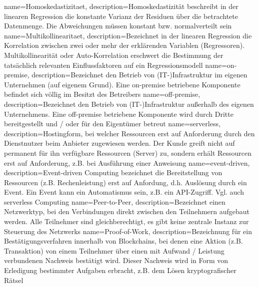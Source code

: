 {
    name=Homoskedastizitaet,
    description={Homoskedastizität beschreibt in der linearen Regression die konstante Varianz der Residuen über die betrachtete Datenmenge. Die Abweichungen müssen konstant bzw. normalverteilt sein}
}
{
    name=Multikollinearitaet,
    description={Bezeichnet in der linearen Regression die Korrelation zwischen zwei oder mehr der erklärenden Variablen (Regressoren). Multikollinearität oder Auto-Korrelation erschwert die Bestimmung der tatsächlich relevanten Einflussfaktoren auf ein Regressionsmodell}
}
{
    name=on-premise,
    description={Bezeichnet den Betrieb von (IT-)Infrastruktur im eigenen Unternehmen (\glqq{}auf eigenem Grund\grqq{}). Eine on-premise betriebene Komponente befindet sich völlig im Besitzt des Betreibers}
}
{
    name=off-premise,
    description={Bezeichnet den Betrieb von (IT-)Infrastruktur außerhalb des eigenen Unternehmens. Eine off-premise betriebene Komponente wird durch Dritte bereitgestellt und / oder für den Eigentümer betreut}
}
{
    name=serverless,
    description={Hostingform, bei welcher Ressourcen erst auf Anforderung durch den Dienstnutzer beim Anbieter zugewiesen werden. Der Kunde greift nicht auf permanent für ihn verfügbare Ressourcen (Server) zu, sondern erhält Ressourcen erst auf Anforderung, z.B. bei Ausführung einer Anweisung}
}
{
    name=event-driven,
    description={Event-driven Computing bezeichnet die Bereitstellung von Ressourcen (z.B. Rechenleistung) erst auf Anfordung, d.h. Auslösung durch ein Event. Ein Event kann ein Automatismus sein, z.B. ein API-Zugriff. Vgl. auch \glqq{}\gls{serverless} Computing\grqq{}}
}
{
    name=Peer-to-Peer,
    description={Bezeichnet einen Netzwerktyp, bei den Verbindungen direkt zwischen den Teilnehmern aufgebaut werden. Alle Teilnehmer sind gleichberechtigt, es gibt keine zentrale Instanz zur Steuerung des Netzwerks}
}
{
    name=Proof-of-Work,
    description={Bezeichnung für ein Bestätigungsverfahren innerhalb von Blockchains, bei denen eine Aktion (z.B. Transaktion) von einem Teilnehmer über einen mit Aufwand / Leistung verbundenen Nachweis bestätigt wird. Dieser Nachweis wird in Form von Erledigung bestimmter Aufgaben erbracht, z.B. dem Lösen kryptografischer Rätsel}
}
